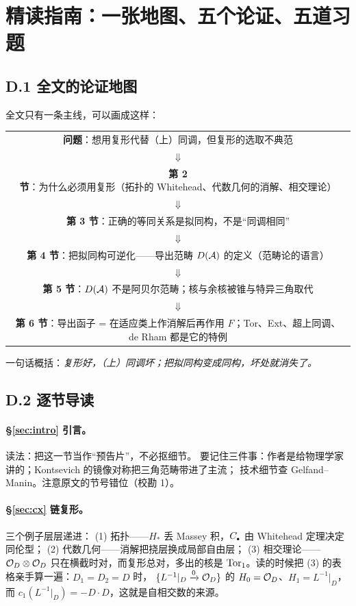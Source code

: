 \section{精读指南：一张地图、五个论证、五道习题}\label{app:reading}

\subsection*{D.1 全文的论证地图}

全文只有一条主线，可以画成这样：

\begin{center}
\small
\begin{tabular}{@{}c@{}}
\textbf{问题}：想用复形代替（上）同调，但复形的选取不典范\\
$\Downarrow$\\
\textbf{第 2 节}：为什么必须用复形（拓扑的 Whitehead、代数几何的消解、相交理论）\\
$\Downarrow$\\
\textbf{第 3 节}：正确的等同关系是拟同构，不是“同调相同”\\
$\Downarrow$\\
\textbf{第 4 节}：把拟同构可逆化——导出范畴 $D(\mathcal{A})$ 的定义（范畴论的语言）\\
$\Downarrow$\\
\textbf{第 5 节}：$D(\mathcal{A})$ 不是阿贝尔范畴；核与余核被锥与特异三角取代\\
$\Downarrow$\\
\textbf{第 6 节}：导出函子 = 在适应类上作消解后再作用 $F$；Tor、Ext、超上同调、
de Rham 都是它的特例
\end{tabular}
\end{center}

一句话概括：\emph{复形好，（上）同调坏；把拟同构变成同构，坏处就消失了。}

\subsection*{D.2 逐节导读}

\paragraph{§\ref{sec:intro} 引言。}读法：把这一节当作“预告片”，不必抠细节。
要记住三件事：作者是给物理学家讲的；Kontsevich 的镜像对称把三角范畴带进了主流；
技术细节查 Gelfand--Manin。注意原文的节号错位（校勘 1）。

\paragraph{§\ref{sec:cx} 链复形。}三个例子层层递进：
(1) 拓扑——$H_*$ 丢 Massey 积，$C_{\scriptscriptstyle\bullet}$ 由 Whitehead 定理决定同伦型；
(2) 代数几何——消解把挠层换成局部自由层；
(3) 相交理论——$\mathcal{O}_D\otimes\mathcal{O}_D$ 只在横截时对，而复形总对，多出的核是
$\operatorname{Tor}_1$。读的时候把 (3) 的表格亲手算一遍：$D_1=D_2=D$ 时，
$\{L^{-1}|_D\xrightarrow{0}\mathcal{O}_D\}$ 的 $H_0=\mathcal{O}_D$、$H_1=L^{-1}|_D$，
而 $c_1(L^{-1}|_D)=-D\cdot D$，这就是自相交数的来源。

